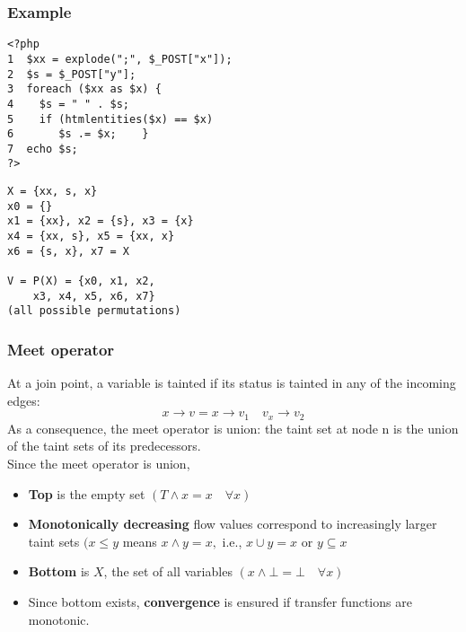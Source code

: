 \documentclass[a4paper, 10pt, titlepage]{article}
\begin{document}
\subsubsection*{Example}
\begin{minipage}{0.5\textwidth}
\begin{small}
\begin{lstlisting}
<?php 
1  $xx = explode(";", $_POST["x"]); 
2  $s = $_POST["y"]; 
3  foreach ($xx as $x) { 
4    $s = " " . $s; 
5    if (htmlentities($x) == $x) 
6       $s .= $x;    } 
7  echo $s; 
?>
\end{lstlisting}
\end{small}
\end{minipage}
\hfill\vline\hfill
\begin{minipage}{0.4\textwidth}
\begin{small}
\begin{lstlisting}
X = {xx, s, x} 
x0 = {} 
x1 = {xx}, x2 = {s}, x3 = {x} 
x4 = {xx, s}, x5 = {xx, x} 
x6 = {s, x}, x7 = X 

V = P(X) = {x0, x1, x2, 
	x3, x4,	x5, x6, x7}
(all possible permutations)
\end{lstlisting}
\end{small}
\end{minipage}
\subsubsection*{Meet operator}
At a join point, a variable is tainted if its status is tainted in any of the incoming edges: 
$$x \rightarrow v = x \rightarrow v_1 \quad v_x \rightarrow v_2$$
As a consequence, the meet operator is union: the taint set at node n is the union of the taint sets of its predecessors. \medskip \\
Since the meet operator is union,
\begin{itemize}
\item \textbf{Top} is the empty set $(T \wedge x = x \quad \forall x)$
\item \textbf{Monotonically decreasing} flow values correspond to increasingly larger taint sets $(x \leq y$ means $x \wedge y = x,$ i.e., $x \cup y = x$ or $y \subseteq x$
\item \textbf{Bottom} is $X$, the set of all variables $(x \wedge \bot = \bot \quad \forall x)$
\item Since bottom exists, \textbf{convergence} is ensured if transfer functions are monotonic.
\end{itemize}
\end{document}
